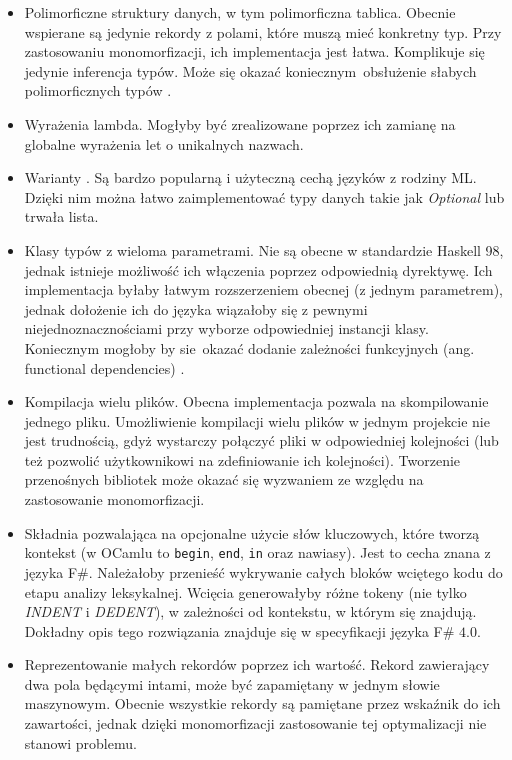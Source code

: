\documentclass[declaration,shortabstract]{iithesis}
\begin{document}
\begin{itemize}
  \item Polimorficzne struktury danych, w tym polimorficzna tablica. Obecnie 
  wspierane są jedynie rekordy z polami, które muszą mieć konkretny typ. 
  Przy zastosowaniu monomorfizacji, ich implementacja jest łatwa. Komplikuje
  się jedynie inferencja typów. Może się okazać koniecznym obsłużenie słabych 
  polimorficznych typów \cite{weak_poly_ocaml}.
  \item Wyrażenia lambda. Mogłyby być zrealizowane poprzez ich zamianę na 
  globalne wyrażenia let o unikalnych nazwach. 
  \item Warianty \cite{variants_ocaml} . Są bardzo popularną i użyteczną cechą 
  języków z rodziny ML. Dzięki nim można łatwo zaimplementować typy danych takie 
  jak \textit{Optional} lub trwała lista.   
  \item Klasy typów z wieloma parametrami. Nie są obecne w standardzie 
  Haskell 98, jednak istnieje możliwość ich włączenia poprzez odpowiednią 
  dyrektywę. Ich implementacja byłaby łatwym 
  rozszerzeniem obecnej (z jednym parametrem), jednak dołożenie ich do języka 
  wiązałoby się z pewnymi niejednoznacznościami \cite{multi_params_tcs}
  przy wyborze odpowiedniej instancji klasy. Koniecznym mogłoby by sie okazać 
  dodanie zależności funkcyjnych (ang. functional dependencies) \cite{fun_deps}.
  \item Kompilacja wielu plików. Obecna implementacja pozwala na skompilowanie 
  jednego pliku. Umożliwienie kompilacji wielu plików w jednym projekcie nie 
  jest trudnością, gdyż wystarczy połączyć pliki w odpowiedniej kolejności 
  (lub też pozwolić użytkownikowi na zdefiniowanie ich kolejności). Tworzenie 
  przenośnych bibliotek może okazać się wyzwaniem ze względu na zastosowanie 
  monomorfizacji.
  \item Składnia pozwalająca na opcjonalne użycie słów kluczowych, które tworzą 
  kontekst (w OCamlu to \texttt{begin}, \texttt{end}, \texttt{in} oraz nawiasy).
  Jest to cecha znana z języka F\#. Należałoby przenieść wykrywanie 
  całych bloków wciętego kodu do etapu analizy leksykalnej. Wcięcia generowałyby 
  różne tokeny (nie tylko \textit{INDENT} i \textit{DEDENT}), w zależności 
  od kontekstu, w którym się znajdują. Dokładny opis tego rozwiązania znajduje 
  się w specyfikacji języka F\# $4.0$\cite{fs_spec}.
  \item Reprezentowanie małych rekordów poprzez ich wartość. Rekord zawierający 
  dwa pola będącymi intami, może być zapamiętany w jednym słowie maszynowym. 
  Obecnie wszystkie rekordy są pamiętane przez wskaźnik do ich zawartości, 
  jednak dzięki monomorfizacji zastosowanie tej optymalizacji nie stanowi 
  problemu.

\end{itemize}
\end{document}
